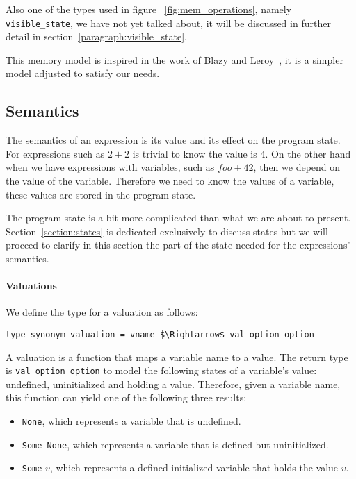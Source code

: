 Also one of the types used in figure ~\ref{fig:mem_operations}, namely \verb|visible_state|, we have not yet talked about, it will be discussed in further detail in section~\ref{paragraph:visible_state}.

This memory model is inspired in the work of Blazy and Leroy~\parencite{compcert}, it is a simpler model adjusted to satisfy our needs.


\subsection{Semantics}\label{subsection:semantics_expressions}

The semantics of an expression is its value and its effect on the program state.
For expressions such as $2 + 2$ is trivial to know the value is $4$.
On the other hand when we have expressions with variables, such as $foo + 42$, then we depend on the value of the variable.
Therefore we need to know the values of a variable, these values are stored in the program state.

The program state is a bit more complicated than what we are about to present.
Section~\ref{section:states} is dedicated exclusively to discuss states but we will proceed to clarify in this section the part of the state needed for the expressions' semantics.

\paragraph{Valuations}\label{paragraph:valuation}

We define the type for a valuation as follows:

\begin{lstlisting}[frame=single, mathescape=true]
type_synonym valuation = vname $\Rightarrow$ val option option
\end{lstlisting}

A valuation is a function that maps a variable name to a value.
The return type is \verb|val option option| to model the following states of a variable's value: undefined, uninitialized and holding a value.
Therefore, given a variable name, this function can yield one of the following three results:

\begin{itemize}
  \item{\verb|None|, which represents a variable that is undefined.}
  \item{\verb|Some None|, which represents a variable that is defined but uninitialized.}
  \item{\verb|Some| $v$, which represents a defined initialized variable that holds the value $v$.}
\end{itemize}


